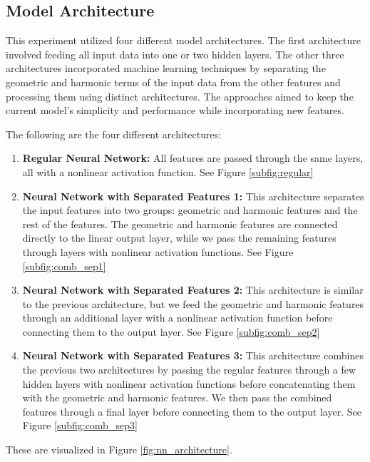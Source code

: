 \subsection{Model Architecture}
This experiment utilized four different model architectures.
The first architecture involved feeding all input data into one or two hidden layers.
The other three architectures incorporated machine learning techniques by separating the geometric and harmonic terms of the input data from the other features and processing them using distinct architectures.
The approaches aimed to keep the current model's simplicity and performance while incorporating new features.

The following are the four different architectures:
\begin{enumerate}
    \item \textbf{Regular Neural Network:} All features are passed through the same layers, all with a nonlinear activation function.
    See Figure \ref{subfig:regular}
    \item \textbf{Neural Network with Separated Features 1:} This architecture separates the input features into two groups: geometric and harmonic features and the rest of the features.
    The geometric and harmonic features are connected directly to the linear output layer, while we pass the remaining features through layers with nonlinear activation functions.
    See Figure \ref{subfig:comb_sep1}
    \item \textbf{Neural Network with Separated Features 2:} This architecture is similar to the previous architecture,
    but we feed the geometric and harmonic features through an additional layer with a nonlinear activation function before connecting them to the output layer.
    See Figure \ref{subfig:comb_sep2}
    \item \textbf{Neural Network with Separated Features 3:} This architecture combines the previous two architectures by passing the regular features through a few hidden layers with nonlinear activation functions before concatenating them with the geometric and harmonic features.
    We then pass the combined features through a final layer before connecting them to the output layer.
    See Figure \ref{subfig:comb_sep3}
\end{enumerate}
These are visualized in Figure \ref{fig:nn_architecture}.

